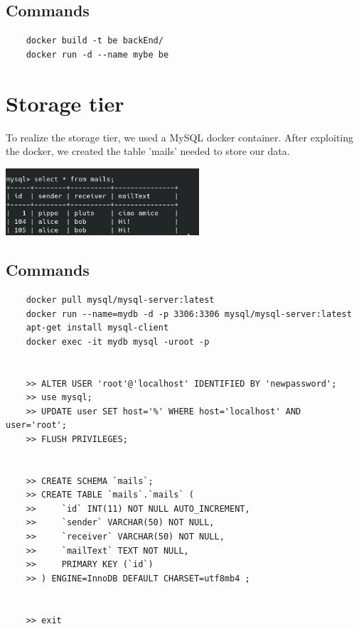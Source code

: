 \documentclass{article}
\begin{document}
\subsection{Commands}
\begin{verbatim}
    docker build -t be backEnd/
    docker run -d --name mybe be
\end{verbatim}




\section{Storage tier}
To realize the storage tier, we used a MySQL docker container. After exploiting the docker, we created the table 'mails' needed to store our data.
\begin{minipage}{\linewidth}
\begin{center}
\vspace{8mm}
\includegraphics[height=2.5cm]{./img/mysql.png} 
\vspace{3mm}
\end{center}
\end{minipage}
\subsection{Commands}
\begin{verbatim}
    docker pull mysql/mysql-server:latest
    docker run --name=mydb -d -p 3306:3306 mysql/mysql-server:latest
    apt-get install mysql-client
    docker exec -it mydb mysql -uroot -p


    >> ALTER USER 'root'@'localhost' IDENTIFIED BY 'newpassword';
    >> use mysql;
    >> UPDATE user SET host='%' WHERE host='localhost' AND user='root';
    >> FLUSH PRIVILEGES;


    >> CREATE SCHEMA `mails`;
    >> CREATE TABLE `mails`.`mails` (
    >>     `id` INT(11) NOT NULL AUTO_INCREMENT,
    >>     `sender` VARCHAR(50) NOT NULL,
    >>     `receiver` VARCHAR(50) NOT NULL,
    >>     `mailText` TEXT NOT NULL,
    >>     PRIMARY KEY (`id`)
    >> ) ENGINE=InnoDB DEFAULT CHARSET=utf8mb4 ;


    >> exit
\end{verbatim}
\end{document}

